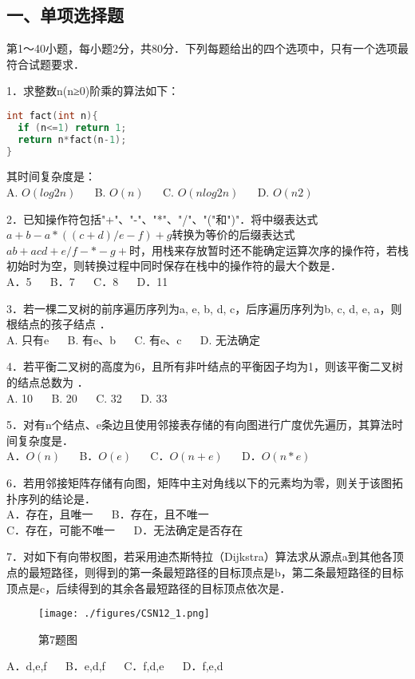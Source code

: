 
\subsection{一、单项选择题}
第1～40小题，每小题2分，共80分．下列每题给出的四个选项中，只有一个选项最符合试题要求．

1．求整数n(n≥0)阶乘的算法如下： \\
\begin{lstlisting}[language=cpp]
int fact(int n){
  if (n<=1) return 1;
  return n*fact(n-1);
}
\end{lstlisting}
其时间复杂度是：\\
A. $O(log2n)$ $\quad$ B. $O(n)$ $\quad$ C. $O(nlog2n)$ $\quad$ D. $O(n2)$

2．已知操作符包括"+"、"-"、"*"、"/"、"("和")"．将中缀表达式$a+b-a*((c+d)/e-f)+g$转换为等价的后缀表达式$ab+acd+e/f-*-g+$时，用栈来存放暂时还不能确定运算次序的操作符，若栈初始时为空，则转换过程中同时保存在栈中的操作符的最大个数是． \\
A．5 $\quad$ B．7 $\quad$ C．8 $\quad$ D．11

3．若一棵二叉树的前序遍历序列为a, e, b, d, c，后序遍历序列为b, c, d, e, a，则根结点的孩子结点 ． \\
A. 只有e $\quad$ B. 有e、b $\quad$ C. 有e、c $\quad$ D. 无法确定

4．若平衡二叉树的高度为6，且所有非叶结点的平衡因子均为1，则该平衡二叉树的结点总数为 ． \\
A. 10 $\quad$ B. 20 $\quad$ C. 32 $\quad$ D. 33

5．对有n个结点、e条边且使用邻接表存储的有向图进行广度优先遍历，其算法时间复杂度是．\\
A．$O(n)$ $\quad$ B．$O(e)$ $\quad$ C．$O(n+e)$ $\quad$ D．$O(n*e)$

6．若用邻接矩阵存储有向图，矩阵中主对角线以下的元素均为零，则关于该图拓扑序列的结论是．\\
A．存在，且唯一 $\quad$ B．存在，且不唯一\\
C．存在，可能不唯一 $\quad$ D．无法确定是否存在

7．对如下有向带权图，若采用迪杰斯特拉（Dijkstra）算法求从源点a到其他各顶点的最短路径，则得到的第一条最短路径的目标顶点是b，第二条最短路径的目标顶点是c，后续得到的其余各最短路径的目标顶点依次是．\\
\begin{figure}[ht]
\centering
\texttt{[image: ./figures/CSN12\_1.png]}
\caption{第7题图} \label{CSN12_fig1}
\end{figure}
A．d,e,f $\quad$ B．e,d,f $\quad$ C．f,d,e $\quad$ D．f,e,d

